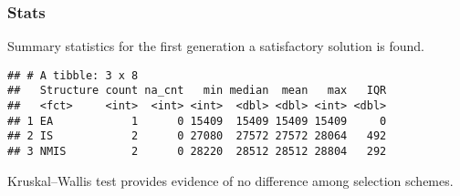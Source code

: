 \documentclass[]{book}
\newenvironment{Shaded}{\begin{snugshade}}{\end{snugshade}}
\newcommand{\CharTok}[1]{\textcolor[rgb]{0.31,0.60,0.02}{#1}}
\newcommand{\DataTypeTok}[1]{\textcolor[rgb]{0.13,0.29,0.53}{#1}}
\newcommand{\DecValTok}[1]{\textcolor[rgb]{0.00,0.00,0.81}{#1}}
\newcommand{\KeywordTok}[1]{\textcolor[rgb]{0.13,0.29,0.53}{\textbf{#1}}}
\newcommand{\NormalTok}[1]{#1}
\newcommand{\OperatorTok}[1]{\textcolor[rgb]{0.81,0.36,0.00}{\textbf{#1}}}
\newcommand{\OtherTok}[1]{\textcolor[rgb]{0.56,0.35,0.01}{#1}}
\newcommand{\StringTok}[1]{\textcolor[rgb]{0.31,0.60,0.02}{#1}}
\begin{document}
\hypertarget{stats-75}{%
\subsubsection{Stats}\label{stats-75}}

Summary statistics for the first generation a satisfactory solution is found.

\begin{Shaded}
\end{Shaded}

\begin{verbatim}
## # A tibble: 3 x 8
##   Structure count na_cnt   min median  mean   max   IQR
##   <fct>     <int>  <int> <int>  <dbl> <dbl> <int> <dbl>
## 1 EA            1      0 15409  15409 15409 15409     0
## 2 IS            2      0 27080  27572 27572 28064   492
## 3 NMIS          2      0 28220  28512 28512 28804   292
\end{verbatim}

Kruskal--Wallis test provides evidence of no difference among selection schemes.
\end{document}
